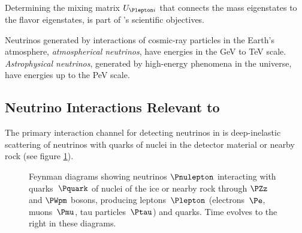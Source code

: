 Determining the mixing matrix $U_{\Plepton i}$ that connects the mass eigenstates to the flavor eigenstates, is part of \icecube's scientific objectives.

Neutrinos generated by interactions of cosmic-ray particles in the Earth's atmosphere, \textit{atmospherical neutrinos}, have energies in the GeV to TeV scale. \textit{Astrophysical neutrinos}, generated by high-energy phenomena in the universe, have energies up to the PeV scale. \cite{instrumentation}


\subsection{Neutrino Interactions Relevant to \icecube}
\label{sec:neutrino_interactions}

The primary interaction channel for detecting neutrinos in \icecube is deep-inelastic scattering of neutrinos with quarks of nuclei in the detector material or nearby rock (see figure \ref{fig:Phei1oob}). \cite{energyreco}

\begin{figure}[htbp]
  \centering
  \hspace{1cm}
  \caption{Feynman diagrams showing neutrinos $\Pnulepton$ interacting with quarks~$\Pquark$ of nuclei of the ice or nearby rock through $\PZz$ and $\PWpm$ bosons, producing leptons~$\Plepton$ (electrons~$\Pe$, muons~$\Pmu$, tau particles~$\Ptau$) and quarks. Time evolves to the right in these diagrams.}
  \label{fig:Phei1oob}
\end{figure}

